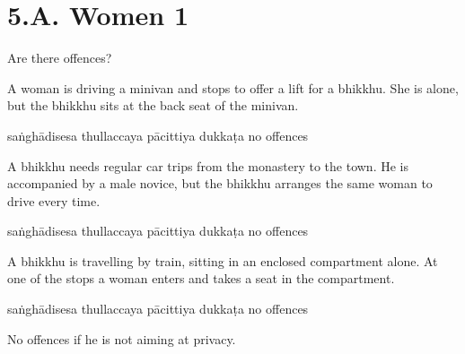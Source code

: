 \chapter{5.A. Women 1}
\renewcommand*{\theChapterTitle}{5.A. Women 1}

\begin{exam}{\autoExamName}

\begin{problem*}

Are there offences?

\begin{parts}

\item A woman is driving a minivan and stops to offer a lift for a bhikkhu.
  She is alone, but the bhikkhu sits at the back seat of the minivan.

  \bigskip

  \begin{answers}{5}
    \bChoices
     saṅghādisesa\eAns
     thullaccaya\eAns
     pācittiya\eAns
     dukkaṭa\eAns
     no offences\eAns
    \eChoices
  \end{answers}

  \bigskip

\item A bhikkhu needs regular car trips from the monastery to the town. He is
  accompanied by a male novice, but the bhikkhu arranges the same woman to drive
  every time.

  \bigskip

  \begin{answers}{5}
    \bChoices
     saṅghādisesa\eAns
     thullaccaya\eAns
     pācittiya\eAns
     dukkaṭa\eAns
     no offences\eAns
    \eChoices
  \end{answers}

  \bigskip

\item A bhikkhu is travelling by train, sitting in an enclosed compartment alone.
  At one of the stops a woman enters and takes a seat in the compartment.

  \bigskip

  \begin{answers}{5}
    \bChoices
     saṅghādisesa\eAns
     thullaccaya\eAns
     pācittiya\eAns
     dukkaṭa\eAns
     no offences\eAns
    \eChoices
  \end{answers}

  \begin{solution}
    No offences if he is not aiming at privacy.
  \end{solution}


\end{parts}
\end{problem*}
\end{exam}
